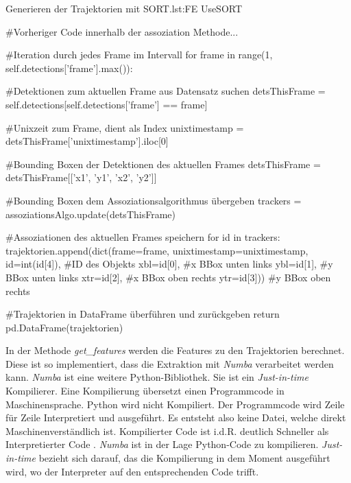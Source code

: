 \begin{pythoncode}{Generieren der Trajektorien mit SORT.}{lst:FE UseSORT}

#Vorheriger Code innerhalb der assoziation Methode...

#Iteration durch jedes Frame im Intervall
for frame in range(1, self.detections['frame'].max()):
    
    #Detektionen zum aktuellen Frame aus Datensatz suchen
    detsThisFrame = self.detections[self.detections['frame'] == frame]

    #Unixzeit zum Frame, dient als Index
    unixtimestamp = detsThisFrame['unixtimestamp'].iloc[0]

    #Bounding Boxen der Detektionen des aktuellen Frames
    detsThisFrame = detsThisFrame[['x1', 'y1', 'x2', 'y2']] 

    #Bounding Boxen dem Assoziationsalgorithmus übergeben
    trackers = assoziationsAlgo.update(detsThisFrame) 

    #Assoziationen des aktuellen Frames speichern 
    for id in trackers:
        trajektorien.append(dict(frame=frame,
                          unixtimestamp=unixtimestamp, 
                          id=int(id[4]),    #ID des Objekts
                          xbl=id[0],        #x BBox unten links
                          ybl=id[1],        #y BBox unten links
                          xtr=id[2],        #x BBox oben rechts
                          ytr=id[3]))       #y BBox oben rechts

    #Trajektorien in DataFrame überführen und zurückgeben
    return pd.DataFrame(trajektorien)
\end{pythoncode}

In der Methode \textit{get\_features} werden die Features zu den Trajektorien berechnet. Diese ist so implementiert, dass die Extraktion mit \textit{Numba} verarbeitet werden kann. \textit{Numba} ist eine weitere Python-Bibliothek. Sie ist ein \textit{\gls{Just-in-time}} Kompilierer. Eine Kompilierung übersetzt einen Programmcode in Maschinensprache. Python wird nicht Kompiliert. Der Programmcode wird Zeile für Zeile Interpretiert und ausgeführt. Es entsteht also keine Datei, welche direkt Maschinenverständlich ist. Kompilierter Code ist i.d.R. deutlich Schneller als Interpretierter Code . \textit{Numba} ist in der Lage Python-Code zu kompilieren. \textit{Just-in-time} bezieht sich darauf, das die Kompilierung in dem Moment ausgeführt wird, wo der Interpreter auf den entsprechenden Code trifft. \par

